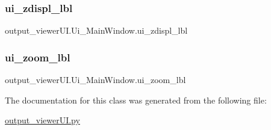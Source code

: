 \subsubsection{\texorpdfstring{ui\+\_\+zdispl\+\_\+lbl}{ui\_zdispl\_lbl}}
{\footnotesize\ttfamily output\+\_\+viewer\+U\+I.\+Ui\+\_\+\+Main\+Window.\+ui\+\_\+zdispl\+\_\+lbl}

\hypertarget{classoutput__viewer_u_i_1_1_ui___main_window_ab3983cab5036a720f91ae2ae62374f73}{}\label{classoutput__viewer_u_i_1_1_ui___main_window_ab3983cab5036a720f91ae2ae62374f73} 
\subsubsection{\texorpdfstring{ui\+\_\+zoom\+\_\+lbl}{ui\_zoom\_lbl}}
{\footnotesize\ttfamily output\+\_\+viewer\+U\+I.\+Ui\+\_\+\+Main\+Window.\+ui\+\_\+zoom\+\_\+lbl}



The documentation for this class was generated from the following file\+:\begin{DoxyCompactItemize}
\item 
\hyperlink{output__viewer_u_i_8py}{output\+\_\+viewer\+U\+I.\+py}\end{DoxyCompactItemize}
